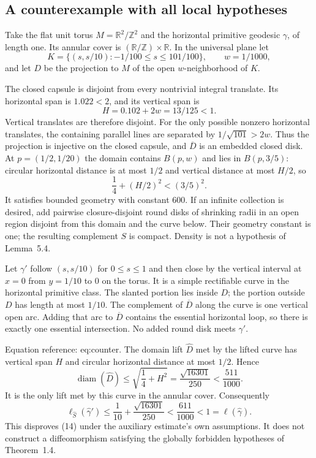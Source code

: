 \documentclass[10pt]{article}
\begin{document}
\subsection*{A counterexample with all local hypotheses}
Take the flat unit torus \(M=\mathbb R^2/\mathbb Z^2\) and the horizontal primitive geodesic \(\gamma\), of length one. Its annular cover is \((\mathbb R/\mathbb Z)\times\mathbb R\). In the universal plane let \[K=\{(s,s/10):-1/100\le s\le101/100\},\qquad w=1/1000,\] and let \(D\) be the projection to \(M\) of the open \(w\)-neighborhood of \(K\).\par
The closed capsule is disjoint from every nontrivial integral translate. Its horizontal span is \(1.022<2\), and its vertical span is \[H=0.102+2w=13/125<1.\] Vertical translates are therefore disjoint. For the only possible nonzero horizontal translates, the containing parallel lines are separated by \(1/\sqrt{101}>2w\). Thus the projection is injective on the closed capsule, and \(\overline D\) is an embedded closed disk. At \(p=(1/2,1/20)\) the domain contains \(B(p,w)\) and lies in \(B(p,3/5)\): circular horizontal distance is at most \(1/2\) and vertical distance at most \(H/2\), so \[\frac14+(H/2)^2<(3/5)^2.\] It satisfies bounded geometry with constant \(600\). If an infinite collection is desired, add pairwise closure-disjoint round disks of shrinking radii in an open region disjoint from this domain and the curve below. Their geometry constant is one; the resulting complement \(S\) is compact. Density is not a hypothesis of Lemma 5.4.\par
Let \(\gamma'\) follow \((s,s/10)\) for \(0\le s\le1\) and then close by the vertical interval at \(x=0\) from \(y=1/10\) to \(0\) on the torus. It is a simple rectifiable curve in the horizontal primitive class. The slanted portion lies inside \(D\); the portion outside \(D\) has length at most \(1/10\). The complement of \(\overline D\) along the curve is one vertical open arc. Adding that arc to \(\overline D\) contains the essential horizontal loop, so there is exactly one essential intersection. No added round disk meets \(\gamma'\).\par
Equation reference: eq:counter. The domain lift \(\widehat D\) met by the lifted curve has vertical span \(H\) and circular horizontal distance at most \(1/2\). Hence \[\operatorname{diam}(\widehat D)\le
 \sqrt{\frac14+H^2}
 =\frac{\sqrt{16301}}{250}<\frac{511}{1000}.\] It is the only lift met by this curve in the annular cover. Consequently \[\ell_{\widehat S}(\widehat\gamma')
 \le\frac1{10}+\frac{\sqrt{16301}}{250}
 <\frac{611}{1000}<1=\ell(\widehat\gamma).
 \] This disproves (14) under the auxiliary estimate’s own assumptions. It does not construct a diffeomorphism satisfying the globally forbidden hypotheses of Theorem 1.4.\par
\end{document}
